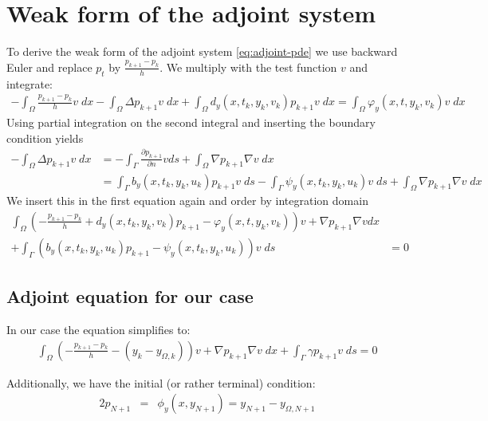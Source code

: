 \documentclass[
12pt, %
a4paper, %
onecolumn, %
portrait %
]{article}
\begin{document}
\section{Weak form of the adjoint system}
To derive the weak form of the adjoint system \eqref{eq:adjoint-pde} we use backward Euler and replace $p_t$ by $\frac{p_{k+1} - p_k}{h}$. We multiply with the test function $v$ and integrate:
\begin{align*}
- \int_{\Omega} \frac{p_{k+1} - p_k}{h} v \; dx - \int_{\Omega} \Delta p_{k+1} v \; dx + \int_{\Omega} d_y(x,t_{k}, y_k, v_k) p_{k+1} v \; dx = \int_{\Omega} \varphi_y(x,t,y_k, v_k) v \; dx
\end{align*}
Using partial integration on the second integral and inserting the boundary condition yields 
\begin{align*}
- \int_{\Omega} \Delta p_{k+1} v \; dx & = - \int_{\Gamma} \frac{\partial p_{k+1}}{\partial n} v ds + \int_{\Omega} \nabla p_{k+1} \nabla v \; dx \\
& = \int_{\Gamma} b_y(x,t_k, y_k, u_k) p_{k+1} v \; ds - \int_{\Gamma} \psi_y(x,t_k, y_k, u_k) v \; ds + \int_{\Omega} \nabla p_{k+1} \nabla v \; dx
\end{align*}
We insert this in the first equation again and order by integration domain
\begin{align*}
\int_{\Omega} (-\frac{p_{k+1} - p_k}{h} + d_y(x,t_{k}, y_k, v_k) p_{k+1} - \varphi_y(x,t,y_k, v_k)) v + \nabla p_{k+1} \nabla v dx & \\
+ \int_{\Gamma} (b_y(x,t_k, y_k, u_k) p_{k+1} - \psi_y(x,t_k, y_k, u_k) ) v \; ds  & = 0
\end{align*}

\subsection{Adjoint equation for our case}
In our case the equation simplifies to:
\begin{align*}
\int_{\Omega} (-\frac{p_{k+1} - p_k}{h} - (y_k - y_{\Omega,k})) v + \nabla p_{k+1} \nabla v \; dx 
+ \int_{\Gamma} \gamma p_{k+1} v \; ds  = 0
\end{align*}

Additionally, we have the initial (or rather terminal) condition:
\begin{alignat*}{2}
p_{N+1} &= &\phi_y(x, y_{N+1}) = y_{N+1} - y_{\Omega, N+1}
\end{alignat*}
\end{document}
